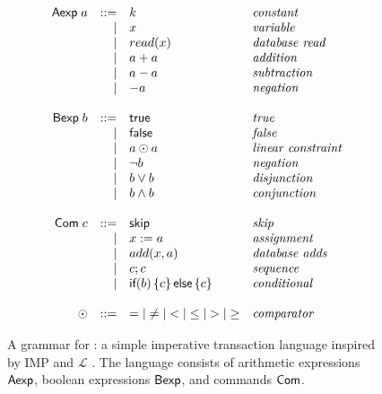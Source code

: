 \begin{figure}[h]
  \centering
  \begin{gather*}
    \begin{array}{rrll}
      \textsf{Aexp}\;
        a & ::= & k       & \text{\emph{constant}} \\
          & |   & x       & \text{\emph{variable}} \\
          & |   & read(x) & \text{\emph{database read}} \\
          & |   & a + a   & \text{\emph{addition}} \\
          & |   & a - a   & \text{\emph{subtraction}} \\
          & |   & - a     & \text{\emph{negation}} \\
      &&& \\
      \textsf{Bexp}\;
        b & ::= & \textsf{true}  & \text{\emph{true}} \\
          & |   & \textsf{false} & \text{\emph{false}} \\
          & |   & a \odot a      & \text{\emph{linear constraint}} \\
          & |   & \lnot b        & \text{\emph{negation}} \\
          & |   & b \lor b       & \text{\emph{disjunction}} \\
          & |   & b \land b      & \text{\emph{conjunction}} \\
      &&& \\
      \textsf{Com}\;
        c  & ::= & \textsf{skip}        & \text{\emph{skip}} \\
           & |   & x := a          & \text{\emph{assignment}} \\
           & |   & add(x, a)       & \text{\emph{database adds}} \\
           & |   & c; c            & \text{\emph{sequence}} \\
           & |   & \textsf{if}(b)\left\{c\right\}\textsf{else}\left\{c\right\} & \text{\emph{conditional}} \\
      &&& \\
      \odot & ::= & =    \vert
                    \neq \vert
                    <    \vert
                    \leq \vert
                    >    \vert
                    \geq & \text{\emph{comparator}}
    \end{array}
  \end{gather*}

  \caption{
    A grammar for \imp{}: a simple imperative transaction language inspired by
    IMP \cite{winskel1993formal} and $\mathcal{L}$ \cite{roy2015homeostasis}.
    The language consists of arithmetic expressions $\textsf{Aexp}{}$, boolean
    expressions $\textsf{Bexp}{}$, and commands $\textsf{Com}{}$.
  }
  \label{fig:imp-grammar}
\end{figure}

